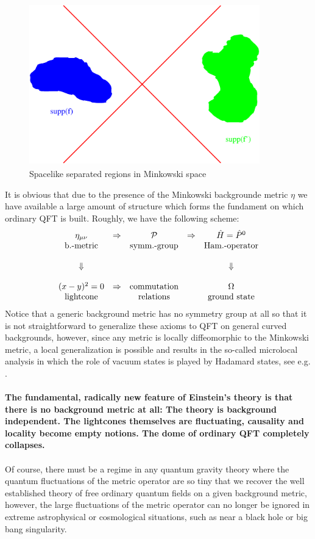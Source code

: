 \documentclass[12pt]{report}
\def\be{\begin{equation}}
\def\ee{\end{equation}}
\begin{document}
\begin{figure}
\includegraphics[width=10cm,height=7cm]{proc9fig2.ps}
\caption{Spacelike separated regions in Minkowski space}
\label{f2}
\end{figure}
%
It is obvious that due to the presence of the Minkowski backgrounde metric
$\eta$ we have available a large amount of structure which forms the 
fundament on which ordinary QFT is built. Roughly, we have the following 
scheme:
\be
\left. \begin{array}{ccccc}
\eta_{\mu\nu} & \Rightarrow & {\cal P} & \Rightarrow & \hat{H}=\hat{P}^0\\
\mbox{b.-metric} & & \mbox{symm.-group} & & \mbox{Ham.-operator} \\
& & & &\\
\Downarrow & & & & \Downarrow\\
& & & &\\
(x-y)^2=0 & \Rightarrow & \mbox{commutation} &  & 
\Omega\\
\mbox{lightcone} & & \mbox{relations} & & \mbox{ground state} 
\end{array} \right. \nonumber
\ee
Notice that a generic background metric has no symmetry group at all
so that it is not straightforward to generalize these axioms to QFT
on general curved backgrounds, however, since any metric is locally 
diffeomorphic to the Minkowski metric, a local generalization is 
possible and results in the so-called microlocal analysis in which
the role of vacuum states is played by Hadamard states, see e.g. 
\cite{3}.\\
\\
{\bf\large The fundamental, radically new feature of Einstein's theory is 
that there is no background metric at all: The theory is background 
independent. The lightcones themselves 
are fluctuating, causality and locality become empty notions. The dome of 
ordinary QFT completely collapses.}\\
\\
Of course, there must be a regime in any quantum gravity theory where
the quantum fluctuations of the metric operator are so tiny that 
we recover the well established theory of free ordinary quantum fields
on a given background metric, however, the large fluctuations of the
metric operator can no longer be ignored in extreme astrophysical
or cosmological situations, such as near a black 
hole or big bang singularity.
\end{document}
